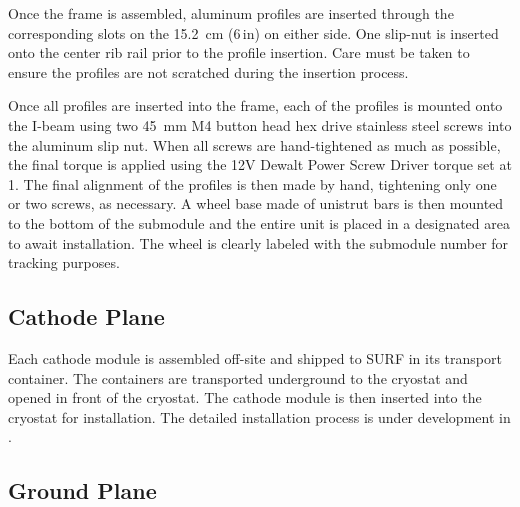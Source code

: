 Once the frame is assembled, aluminum profiles are inserted through the corresponding slots on the \SI{15.2}{\cm} (\num{6}\,in) on either side.  One slip-nut 
is inserted onto the center rib rail prior to the profile insertion.  
Care must be taken to ensure the profiles are not scratched during the insertion process. 

Once all profiles are inserted into the frame, each of the profiles is mounted onto the I-beam using two \SI{45}{\mm} M4 button head hex drive stainless steel screws into the aluminum slip nut. 
When all screws are hand-tightened as much as possible, the final torque is applied using the 12V Dewalt Power Screw Driver torque set at 1.  The final alignment of the profiles is then made by hand, tightening only one or two screws, as necessary.
A wheel base made of unistrut bars is then mounted to the bottom of the submodule and the entire unit is placed in a designated area to await installation.   The wheel is clearly labeled with the submodule number for tracking purposes.


\subsection{Cathode Plane}
\label{sec:fddp-hv-prod-assy-cathode}



Each cathode module is assembled off-site and shipped to SURF in its transport container.   The containers are transported underground to the cryostat and opened in front of the cryostat.  The cathode module is then inserted into the cryostat for installation.  The detailed installation process is under development in .

\subsection{Ground Plane} %
\label{sec:fddp-prod-assy-ground-grid}


